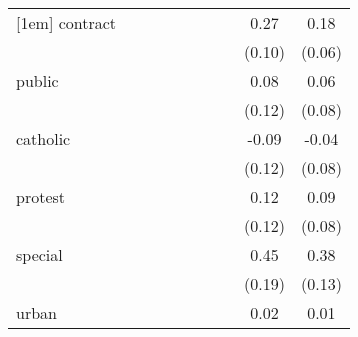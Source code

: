 \documentclass{article}
\begin{document}
{\begin{tabular}{l*{9}{c}}
[1em]
contract    &                     &                     &                     &                     &                     &                     &                     &        0.27\sym{***}&        0.18\sym{***}\\
            &                     &                     &                     &                     &                     &                     &                     &      (0.10)         &      (0.06)         \\
[1em]
public      &                     &                     &                     &                     &                     &                     &                     &        0.08         &        0.06         \\
            &                     &                     &                     &                     &                     &                     &                     &      (0.12)         &      (0.08)         \\
[1em]
catholic    &                     &                     &                     &                     &                     &                     &                     &       -0.09         &       -0.04         \\
            &                     &                     &                     &                     &                     &                     &                     &      (0.12)         &      (0.08)         \\
[1em]
protest     &                     &                     &                     &                     &                     &                     &                     &        0.12         &        0.09         \\
            &                     &                     &                     &                     &                     &                     &                     &      (0.12)         &      (0.08)         \\
[1em]
special     &                     &                     &                     &                     &                     &                     &                     &        0.45\sym{**} &        0.38\sym{***}\\
            &                     &                     &                     &                     &                     &                     &                     &      (0.19)         &      (0.13)         \\
[1em]
urban       &                     &                     &                     &                     &                     &                     &                     &        0.02         &        0.01         \\

\end{tabular}}
\end{document}
